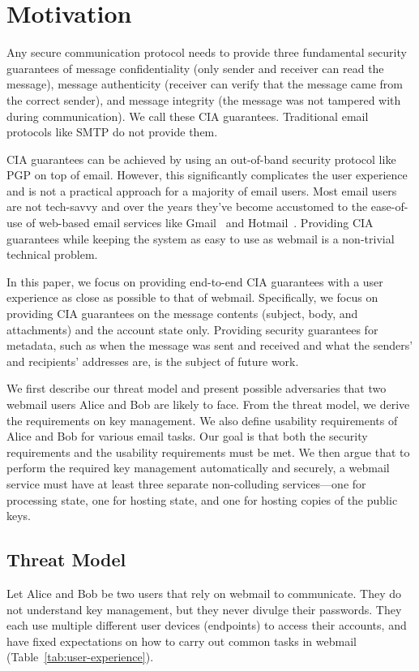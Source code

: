 \section{Motivation}

Any secure communication protocol needs to provide three 
fundamental security guarantees of message confidentiality 
(only sender and receiver can read the message), message 
authenticity (receiver can verify that the message came 
from the correct sender), and message integrity (the message 
was not tampered with during communication). We call these 
CIA guarantees. Traditional email protocols like SMTP do not
provide them.

CIA guarantees can be achieved by using an out-of-band security 
protocol like PGP on top of email. However, this significantly 
complicates the user experience and is not a practical approach 
for a majority of email users. Most email users are not tech-savvy 
and over the years they’ve become accustomed to the ease-of-use of 
web-based email services like Gmail~\cite{GMail} and Hotmail~\cite{hotmail}. Providing CIA 
guarantees while keeping the system as easy to use as webmail is 
a non-trivial technical problem. 

In this paper, we focus on providing end-to-end CIA guarantees 
with a user experience as close as possible to that of webmail. 
Specifically, we focus on providing CIA guarantees on the message 
contents (subject, body, and attachments) and the account state only. 
Providing security guarantees for metadata, such as when the message 
was sent and received and what the senders’ and recipients’ addresses 
are, is the subject of future work.

We first describe our threat model and present possible adversaries 
that two webmail users Alice and Bob are likely to face. From the 
threat model, we derive the requirements on key management. We also 
define usability requirements of Alice and Bob for various email tasks.
 Our goal is that both the security requirements and the usability 
requirements must be met. We then argue that to perform the required 
key management automatically and securely, a webmail service must 
have at least three separate non-colluding services---one for processing 
state, one for hosting state, and one for hosting copies of the public keys. 

\subsection{Threat Model}
Let Alice and Bob be two users that rely on webmail to communicate.  They do not understand key management, but they never divulge their passwords. They each use multiple different user devices (endpoints) to access their accounts, and have fixed expectations on how to carry out common tasks in webmail (Table~\ref{tab:user-experience}).

